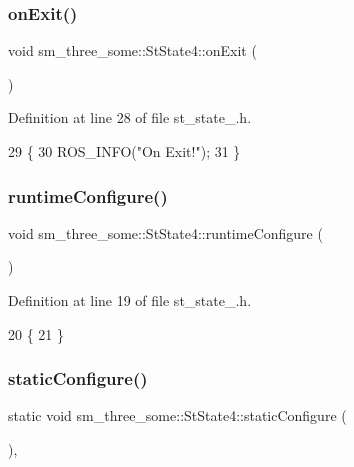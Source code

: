 \subsubsection{\texorpdfstring{on\+Exit()}{onExit()}}
{\footnotesize\ttfamily void sm\+\_\+three\+\_\+some\+::\+St\+State4\+::on\+Exit (\begin{DoxyParamCaption}{ }\end{DoxyParamCaption})\hspace{0.3cm}{\ttfamily [inline]}}



Definition at line 28 of file st\+\_\+state\+\_.\+h.


\begin{DoxyCode}
29     \{
30         ROS\_INFO(\textcolor{stringliteral}{"On Exit!"});
31     \}
\end{DoxyCode}
\mbox{\label{structsm__three__some_1_1StState4_a44ef81afd6a1ad3144fbc39c44954439}} 
\subsubsection{\texorpdfstring{runtime\+Configure()}{runtimeConfigure()}}
{\footnotesize\ttfamily void sm\+\_\+three\+\_\+some\+::\+St\+State4\+::runtime\+Configure (\begin{DoxyParamCaption}{ }\end{DoxyParamCaption})\hspace{0.3cm}{\ttfamily [inline]}}



Definition at line 19 of file st\+\_\+state\+\_.\+h.


\begin{DoxyCode}
20     \{
21     \}
\end{DoxyCode}
\mbox{\label{structsm__three__some_1_1StState4_ae244f918fa096ecbb501e25b9ca07512}} 
\subsubsection{\texorpdfstring{static\+Configure()}{staticConfigure()}}
{\footnotesize\ttfamily static void sm\+\_\+three\+\_\+some\+::\+St\+State4\+::static\+Configure (\begin{DoxyParamCaption}{ }\end{DoxyParamCaption})\hspace{0.3cm}{\ttfamily [inline]}, {\ttfamily [static]}}



